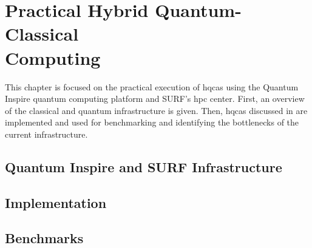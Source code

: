 \chapter[Practical Hybrid Quantum-Classical Computing]{Practical Hybrid Quantum-Classical\\Computing} \label{chap:practical-hybrid-quantum-classical-computing}
This chapter is focused on the practical execution of \glspl{hqca} using the Quantum Inspire quantum computing platform and SURF's \gls{hpc} center.
First, an overview of the classical and quantum infrastructure is given.
Then, \glspl{hqca} discussed in  are implemented and used for benchmarking and identifying the bottlenecks of the current infrastructure.

\section{Quantum Inspire and SURF Infrastructure}

\section{Implementation}

\section{Benchmarks}